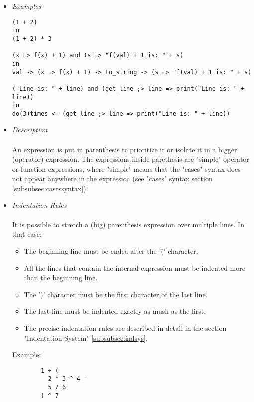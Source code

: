 \documentclass{article}
\begin{document}
\begin{itemize}

\item \textit{Examples}
\begin{verbatim}
(1 + 2)
in
(1 + 2) * 3

(x => f(x) + 1) and (s => "f(val) + 1 is: " + s)
in
val -> (x => f(x) + 1) -> to_string -> (s => "f(val) + 1 is: " + s)

("Line is: " + line) and (get_line ;> line => print("Line is: " + line))
in
do(3)times <- (get_line ;> line => print("Line is: " + line))
\end{verbatim}

\item \textit{Description} \\\\
An expression is put in parenthesis to prioritize it or isolate it in a bigger
(operator) expression. The expressions inside parethesis are "simple" operator
or function expressions, where "simple" means that the "cases"
syntax does not appear anywhere in the expression (see "cases" syntax section
\ref{subsubsec:casessyntax}).

\item \textit{Indentation Rules} \\\\
It is possible to stretch a (big) parenthesis expression over multiple lines.
In that case:
\begin{itemize}
\item
The beginning line must be ended after the '(' character.

\item
All the lines that contain the internal expression must be indented more than 
the beginning line.

\item
The ')' character must be the first character of the last line.

\item
The last line must be indented exactly as mush as the first.

\item
The precise indentation rules are described in detail in the section
"Indentation System" \ref{subsubsec:indsys}.
\end{itemize}

Example:
\begin{verbatim}
        1 + (
          2 * 3 ^ 4 -
          5 / 6
        ) ^ 7
\end{verbatim}



\end{itemize}
\end{document}
